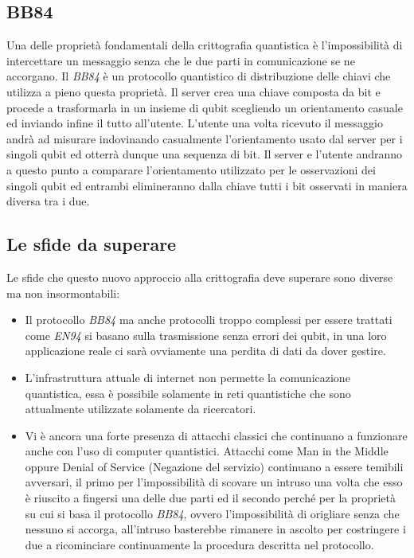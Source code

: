 \documentclass[a4paper, 12pt]{article}
\begin{document}
\subsection{BB84}
Una delle proprietà fondamentali della crittografia quantistica è l'impossibilità di intercettare un messaggio senza che le due parti in comunicazione se ne accorgano.\newline
Il \textit{BB84} è un protocollo quantistico di distribuzione delle chiavi che utilizza a pieno questa proprietà.\newline
Il server crea una chiave composta da bit e procede a trasformarla in un insieme di qubit scegliendo un orientamento casuale ed inviando infine il tutto all'utente.
L'utente una volta ricevuto il messaggio andrà ad misurare indovinando casualmente l'orientamento usato dal server per i singoli qubit ed otterrà dunque una sequenza di bit. Il server e l'utente andranno a questo punto a comparare l'orientamento utilizzato per le osservazioni dei singoli qubit ed entrambi elimineranno dalla chiave tutti i bit osservati in maniera diversa tra i due.
\subsection{Le sfide da superare}
Le sfide che questo nuovo approccio alla crittografia deve superare sono diverse ma non insormontabili:
\begin{itemize}
\item Il protocollo \textit{BB84} ma anche protocolli troppo complessi per essere trattati come \textit{EN94} si basano sulla trasmissione senza errori dei qubit, in una loro applicazione reale ci sarà ovviamente una perdita di dati da dover gestire.
\item L'infrastruttura attuale di internet non permette la comunicazione quantistica, essa è possibile solamente in reti quantistiche che sono attualmente utilizzate solamente da ricercatori.
\item Vi è ancora una forte presenza di attacchi classici che continuano a funzionare anche con l'uso di computer quantistici. Attacchi come Man in the Middle oppure Denial of Service (Negazione del servizio) continuano a essere temibili avversari, il primo per l'impossibilità di scovare un intruso una volta che esso è riuscito a fingersi una delle due parti ed il secondo perché per la proprietà su cui si basa il protocollo \textit{BB84}, ovvero l'impossibilità di origliare senza che nessuno si accorga, all'intruso basterebbe rimanere in ascolto per costringere i due a ricominciare continuamente la procedura descritta nel protocollo.
\end{itemize}
\end{document}
